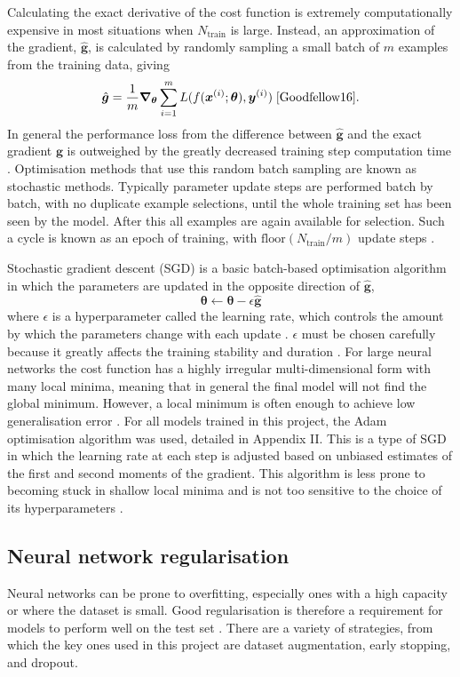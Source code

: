 \documentclass[12pt]{article}
\begin{document}
Calculating the exact derivative of the cost function is extremely computationally expensive in most situations when $N_{\mathrm{train}}$ is large. Instead, an approximation of the gradient, $\hat{\bm{g}}$, is calculated by randomly sampling a small batch of $m$ examples from the training data, giving
\begin{equation}
\hat{\bm{g}}=\frac{1}{m}\bm\nabla_{\bm\theta}\sum_{i=1}^mL(f(\bm{x}^{(i)};\boldsymbol\theta),\bm{y}^{(i)})\;\cite{Goodfellow16}.
\end{equation}
In general the performance loss from the difference between $\hat{\bm{g}}$ and the exact gradient $\bm{g}$ is outweighed by the greatly decreased training step computation time \cite{Goodfellow16}. Optimisation methods that use this random batch sampling are known as stochastic methods. Typically parameter update steps are performed batch by batch, with no duplicate example selections, until the whole training set has been seen by the model. After this all examples are again available for selection. Such a cycle is known as an epoch of training, with $\mathrm{floor}(N_{\mathrm{train}}/m)$ update steps \cite{Goodfellow16}.

Stochastic gradient descent (SGD) is a basic batch-based optimisation algorithm in which the parameters are updated in the opposite direction of $\hat{\bm{g}}$,
\begin{equation}
\bm\theta\leftarrow\bm\theta-\epsilon\hat{\bm{g}}
\end{equation}
where $\epsilon$ is a hyperparameter called the learning rate, which controls the amount by which the parameters change with each update \cite{Amari93}. $\epsilon$ must be chosen carefully because it greatly affects the training stability and duration \cite{Goodfellow16}. For large neural networks the cost function has a highly irregular multi-dimensional form with many local minima, meaning that in general the final model will not find the global minimum. However, a local minimum is often enough to achieve low generalisation error \cite{Goodfellow16}. For all models trained in this project, the Adam optimisation algorithm was used, detailed in Appendix II. This is a type of SGD in which the learning rate at each step is adjusted based on unbiased estimates of the first and second moments of the gradient. This algorithm is less prone to becoming stuck in shallow local minima and is not too sensitive to the choice of its hyperparameters \cite{Kingma14}. 

\subsection{Neural network regularisation}
Neural networks can be prone to overfitting, especially ones with a high capacity or where the dataset is small. Good regularisation is therefore a requirement for models to perform well on the test set \cite{Goodfellow16}. There are a variety of strategies, from which the key ones used in this project are dataset augmentation, early stopping, and dropout.
\end{document}
